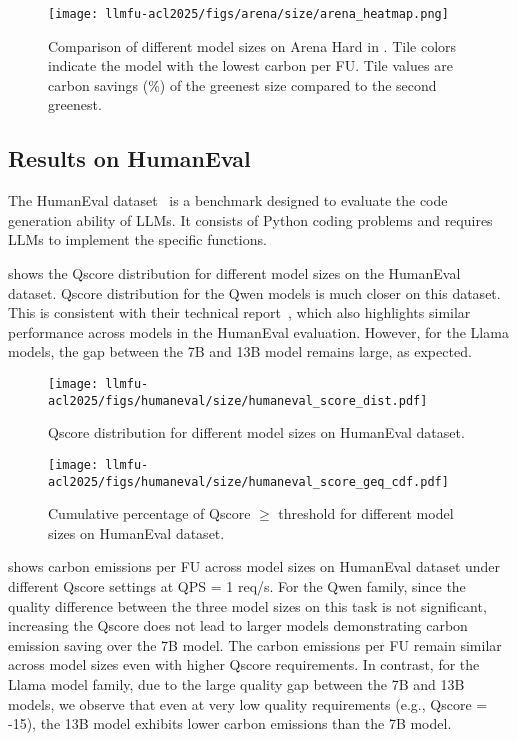 \begin{figure}[!t]
    \centering
    \texttt{[image: llmfu-acl2025/figs/arena/size/arena\_heatmap.png]}
    \caption{Comparison of different model sizes on Arena Hard in \SYSTEM{}. Tile colors indicate the model with the lowest carbon per FU. Tile values are carbon savings (\%) of the greenest size compared to the second greenest.}
    \label{fig:size_arena_heatmap}
\end{figure}

\subsection{Results on HumanEval}
The HumanEval dataset~\cite{chen2021humaneval} is a benchmark designed to evaluate the code generation ability of LLMs. It consists of Python coding problems and requires LLMs to implement the specific functions. 

 shows the Qscore distribution for different model sizes on the HumanEval dataset. Qscore distribution for the Qwen models is much closer on this dataset. This is consistent with their technical report~\cite{qwen2025qwen25technicalreport}, which also highlights similar performance across models in the HumanEval evaluation. However, for the Llama models, the gap between the 7B and 13B model remains large, as expected. 


\begin{figure}[!t]
    \centering
    \texttt{[image: llmfu-acl2025/figs/humaneval/size/humaneval\_score\_dist.pdf]}
    \caption{Qscore distribution for different model sizes on HumanEval dataset.}
    \label{fig:humaneval_size_score_dist}
\end{figure}

\begin{figure}[!t]
    \centering
    \texttt{[image: llmfu-acl2025/figs/humaneval/size/humaneval\_score\_geq\_cdf.pdf]}
    \caption{Cumulative percentage of Qscore $\geq$ threshold for different model sizes on HumanEval dataset.}
    \label{fig:humaneval_size_score_dist_cumu}
\end{figure}

 shows carbon emissions per FU across model sizes on HumanEval dataset under different Qscore settings at QPS = 1 req/s. For the Qwen family, since the quality difference between the three model sizes on this task is not significant, increasing the Qscore does not lead to larger models demonstrating carbon emission saving over the 7B model. The carbon emissions per FU remain similar across model sizes even with higher Qscore requirements.
In contrast, for the Llama model family, due to the large quality gap between the 7B and 13B models, we observe that even at very low quality requirements (e.g., Qscore = -15), the 13B model exhibits lower carbon emissions than the 7B model. 



